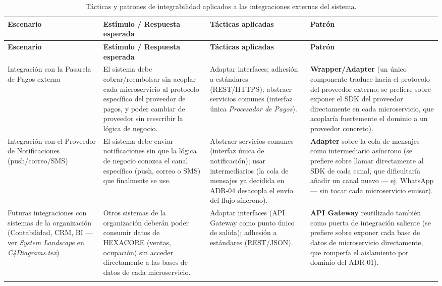 \documentclass[12pt,a4paper]{article}
\begin{document}
\begin{center}
\begin{longtable}{p{2.6cm}p{4.7cm}p{3.6cm}p{2.9cm}}
\toprule
\textbf{Escenario} & \textbf{Estímulo / Respuesta esperada} & \textbf{Tácticas aplicadas} & \textbf{Patrón}\\
\midrule
\endfirsthead
\toprule
\textbf{Escenario} & \textbf{Estímulo / Respuesta esperada} & \textbf{Tácticas aplicadas} & \textbf{Patrón}\\
\midrule
\endhead
Integración con la Pasarela de Pagos externa &
El sistema debe cobrar/reembolsar sin acoplar cada microservicio al protocolo específico del
proveedor de pagos, y poder cambiar de proveedor sin reescribir la lógica de negocio. &
Adaptar interfaces; adhesión a estándares (REST/HTTPS); abstraer servicios comunes (interfaz
única \textit{Procesador de Pagos}). &
\textbf{Wrapper/Adapter} (un único componente traduce hacia el protocolo del proveedor externo;
se prefiere sobre exponer el SDK del proveedor directamente en cada microservicio, que
acoplaría fuertemente el dominio a un proveedor concreto).\\[0.5em]

Integración con el Proveedor de Notificaciones (push/correo/SMS) &
El sistema debe enviar notificaciones sin que la lógica de negocio conozca el canal específico
(push, correo o SMS) que finalmente se use. &
Abstraer servicios comunes (interfaz única de notificación); usar intermediarios (la cola de
mensajes ya decidida en ADR-04 desacopla el envío del flujo síncrono). &
\textbf{Adapter} sobre la cola de mensajes como intermediario asíncrono (se prefiere sobre
llamar directamente al SDK de cada canal, que dificultaría añadir un canal nuevo — ej. WhatsApp
— sin tocar cada microservicio emisor).\\[0.5em]

Futuras integraciones con sistemas de la organización (Contabilidad, CRM, BI — ver
\textit{System Landscape} en \textit{C4Diagrams.tex}) &
Otros sistemas de la organización deberán poder consumir datos de HEXACORE (ventas, ocupación)
sin acceder directamente a las bases de datos de cada microservicio. &
Adaptar interfaces (API Gateway como punto único de salida); adhesión a estándares (REST/JSON). &
\textbf{API Gateway} reutilizado también como puerta de integración saliente (se prefiere sobre
exponer cada base de datos de microservicio directamente, que rompería el aislamiento por
dominio del ADR-01).\\
\bottomrule
\caption{Tácticas y patrones de integrabilidad aplicados a las integraciones externas del
sistema.}
\label{tab:tacticas-integrabilidad}
\end{longtable}
\end{center}
\end{document}
